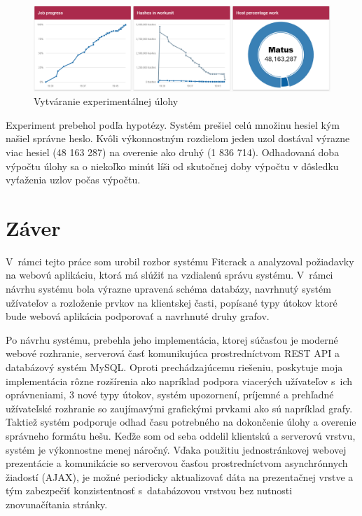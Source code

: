 \documentclass[slovak]{fitthesis}
\begin{document}
\begin{figure}[H]
    \centering
    \includegraphics[scale=0.4]{obrazky/exp3.PNG}
    \caption{Vytváranie experimentálnej úlohy}
    \label{fig:exp3}
\end{figure}
\noindent
Experiment prebehol podľa hypotézy. Systém prešiel celú množinu hesiel kým našiel správne heslo. Kvôli výkonnostným rozdielom jeden uzol dostával výrazne viac hesiel (48 163 287) na overenie ako druhý (1 836 714). Odhadovaná doba výpočtu úlohy sa o niekoľko minút líši od skutočnej doby výpočtu v dôsledku vyťaženia uzlov počas výpočtu.



\chapter{Záver}\label{zaver}
V~rámci tejto práce som urobil rozbor systému Fitcrack a analyzoval požiadavky na webovú aplikáciu, ktorá má slúžiť na vzdialenú správu systému. V~rámci návrhu systému bola výrazne upravená schéma databázy, navrhnutý systém užívateľov a rozloženie prvkov na klientskej časti, popísané typy útokov ktoré bude webová aplikácia podporovať a navrhnuté druhy grafov.

Po návrhu systému, prebehla jeho implementácia, ktorej súčasťou je moderné webové rozhranie, serverová časť komunikujúca prostredníctvom REST API a databázový systém MySQL. Oproti prechádzajúcemu riešeniu, poskytuje moja implementácia rôzne rozšírenia ako napríklad podpora viacerých užívateľov s~ich oprávneniami, 3 nové typy útokov, systém upozornení, príjemné a prehľadné užívateľské rozhranie so zaujímavými grafickými prvkami ako sú napríklad grafy. Taktiež systém podporuje odhad času potrebného na dokončenie úlohy a overenie správneho formátu hešu. Keďže som od seba oddelil klientskú a serverovú vrstvu, systém je výkonnostne menej náročný. Vďaka použitiu jednostránkovej webovej prezentácie a komunikácie so serverovou časťou prostredníctvom asynchrónnych žiadostí (AJAX), je možné periodicky aktualizovať dáta na prezentačnej vrstve a tým zabezpečiť konzistentnosť s~databázovou vrstvou bez nutnosti znovunačítania stránky.
\end{document}
